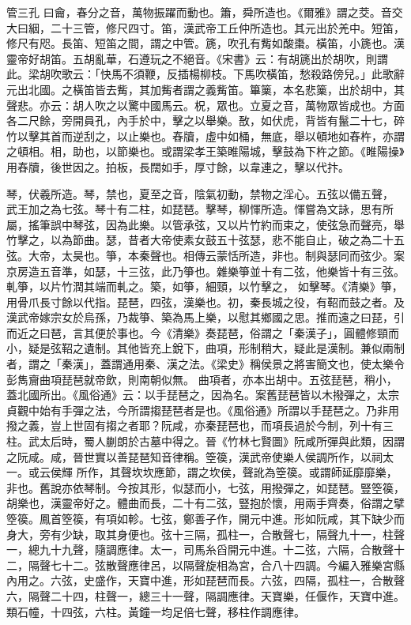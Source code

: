 \begin{pinyinscope}
 管三孔
 曰龠，春分之音，萬物振躍而動也。簫，舜所造也。《爾雅》謂之茭。音交大曰絪，二十三管，修尺四寸。笛，漢武帝工丘仲所造也。其元出於羌中。短笛，修尺有咫。長笛、短笛之間，謂之中管。篪，吹孔有觜如酸棗。橫笛，小篪也。漢靈帝好胡笛。五胡亂華，石遵玩之不絕音。《宋書》云：有胡篪出於胡吹，則謂此。梁胡吹歌云：「快馬不須鞭，反插楊柳枝。下馬吹橫笛，愁殺路傍兒。」此歌辭元出北國。之橫笛皆去觜，其加觜者謂之義觜笛。篳篥，本名悲篥，出於胡中，其
 聲悲。亦云：胡人吹之以驚中國馬云。柷，眾也。立夏之音，萬物眾皆成也。方面各二尺餘，旁開員孔，內手於中，擊之以舉樂。敔，如伏虎，背皆有鬣二十七，碎竹以擊其首而逆刮之，以止樂也。舂牘，虛中如桶，無底，舉以頓地如舂杵，亦謂之頓相。相，助也，以節樂也。或謂梁孝王築睢陽城，擊鼓為下杵之節。《睢陽操》用舂牘，後世因之。拍板，長闊如手，厚寸餘，以韋連之，擊以代抃。



 琴，伏羲所造。琴，禁也，夏至之音，陰氣初動，禁物之淫心。五弦以備五聲，
 武王加之為七弦。琴十有二柱，如琵琶。擊琴，柳惲所造。惲嘗為文詠，思有所屬，搖筆誤中琴弦，因為此樂。以管承弦，又以片竹約而束之，使弦急而聲亮，舉竹擊之，以為節曲。瑟，昔者大帝使素女鼓五十弦瑟，悲不能自止，破之為二十五弦。大帝，太昊也。箏，本秦聲也。相傳云蒙恬所造，非也。制與瑟同而弦少。案京房造五音準，如瑟，十三弦，此乃箏也。雜樂箏並十有二弦，他樂皆十有三弦。軋箏，以片竹潤其端而軋之。築，如箏，細頸，以竹擊之，
 如擊琴。《清樂》箏，用骨爪長寸餘以代指。琵琶，四弦，漢樂也。初，秦長城之役，有鞀而鼓之者。及漢武帝嫁宗女於烏孫，乃裁箏、築為馬上樂，以慰其鄉國之思。推而遠之曰琵，引而近之曰琶，言其便於事也。今《清樂》奏琵琶，俗謂之「秦漢子」，圓體修頸而小，疑是弦鞀之遺制。其他皆充上銳下，曲項，形制稍大，疑此是漢制。兼似兩制者，謂之「秦漢」，蓋謂通用秦、漢之法。《梁史》稱侯景之將害簡文也，使太樂令彭雋齎曲項琵琶就帝飲，則南朝似無。
 曲項者，亦本出胡中。五弦琵琶，稍小，蓋北國所出。《風俗通》云：以手琵琶之，因為名。案舊琵琶皆以木撥彈之，太宗貞觀中始有手彈之法，今所謂搊琵琶者是也。《風俗通》所謂以手琵琶之。乃非用撥之義，豈上世固有搊之者耶？阮咸，亦秦琵琶也，而項長過於今制，列十有三柱。武太后時，蜀人蒯朗於古墓中得之。晉《竹林七賢圖》阮咸所彈與此類，因謂之阮咸。咸，晉世實以善琵琶知音律稱。箜篌，漢武帝使樂人侯調所作，以祠太一。或云侯輝
 所作，其聲坎坎應節，謂之坎侯，聲訛為箜篌。或謂師延靡靡樂，非也。舊說亦依琴制。今按其形，似瑟而小，七弦，用撥彈之，如琵琶。豎箜篌，胡樂也，漢靈帝好之。體曲而長，二十有二弦，豎抱於懷，用兩手齊奏，俗謂之擘箜篌。鳳首箜篌，有項如軫。七弦，鄭善子作，開元中進。形如阮咸，其下缺少而身大，旁有少缺，取其身便也。弦十三隔，孤柱一，合散聲七，隔聲九十一，柱聲一，總九十九聲，隨調應律。太一，司馬糸舀開元中進。十二弦，六隔，合散聲十
 二，隔聲七十二。弦散聲應律呂，以隔聲旋相為宮，合八十四調。今編入雅樂宮縣內用之。六弦，史盛作，天寶中進，形如琵琶而長。六弦，四隔，孤柱一，合散聲六，隔聲二十四，柱聲一，總三十一聲，隔調應律。天寶樂，任偃作，天寶中進。類石幢，十四弦，六柱。黃鐘一均足倍七聲，移柱作調應律。




\end{pinyinscope}
